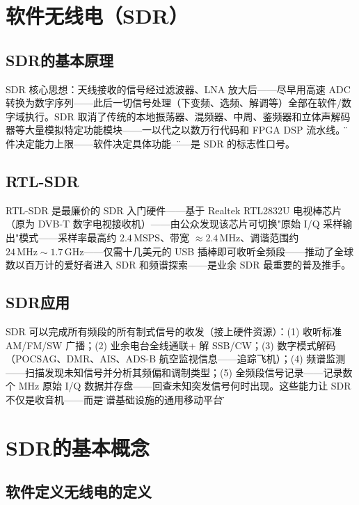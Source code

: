 \documentclass[12pt,UTF8]{ctexbook}
\begin{document}
\section{软件无线电（SDR）}
\label{sec:sdr}

\subsection{SDR的基本原理}

SDR 核心思想：天线接收的信号经过滤波器、LNA 放大后——尽早用高速 ADC 转换为数字序列——此后一切信号处理（下变频、选频、解调等）全部在软件/数字域执行。SDR 取消了传统的本地振荡器、混频器、中周、鉴频器和立体声解码器等大量模拟特定功能模块——一以代之以数万行代码和 FPGA DSP 流水线。\"硬件决定能力上限——软件决定具体功能\"——是 SDR 的标志性口号。

\subsection{RTL-SDR}

RTL-SDR 是最廉价的 SDR 入门硬件——基于 Realtek RTL2832U 电视棒芯片（原为 DVB-T 数字电视接收机）——由公众发现该芯片可切换"原始 I/Q 采样输出"模式——采样率最高约 $2.4\,\mathrm{MSPS}$、带宽 $\approx2.4\,\mathrm{MHz}$、调谐范围约 $24\,\mathrm{MHz}\sim1.7\,\mathrm{GHz}$——仅需十几美元的 USB 插棒即可收听全频段——推动了全球数以百万计的爱好者进入 SDR 和频谱探索——是业余 SDR 最重要的普及推手。

\subsection{SDR应用}

SDR 可以完成所有频段的所有制式信号的收发（接上硬件资源）：(1) 收听标准 AM/FM/SW 广播；(2) 业余电台全线通联+ 解 SSB/CW；(3) 数字模式解码（POCSAG、DMR、AIS、ADS-B 航空监视信息——追踪飞机）；(4) 频谱监测——扫描发现未知信号并分析其频偏和调制类型；(5) 全频段信号记录——记录数个 MHz 原始 I/Q 数据并存盘——回查未知突发信号何时出现。这些能力让 SDR 不仅是收音机——而是\"频谱基础设施的通用移动平台\"。

\section{SDR的基本概念}
\label{sec:sdr_concept}

\subsection{软件定义无线电的定义}
\end{document}
